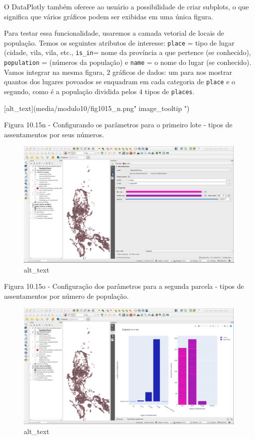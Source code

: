 \documentclass[
]{book}
\begin{document}
O DataPlotly também oferece ao usuário a possibilidade de criar subplots, o que significa que vários gráficos podem ser exibidas em uma única figura.

Para testar essa funcionalidade, usaremos a camada vetorial de locais de população. Temos os seguintes atributos de interesse: \texttt{place} = tipo de lugar (cidade, vila, vila, etc., \texttt{is\_in}= nome da província a que pertence (se conhecido), \texttt{population} = (números da população) e \texttt{name} = o nome do lugar (se conhecido). Vamos integrar na mesma figura, 2 gráficos de dados: um para nos mostrar quantos dos lugares povoados se enquadram em cada categoria de \texttt{place} e o segundo, como é a população dividida pelos 4 tipos de \texttt{places}.

{[}alt\_text{]}(media/modulo10/fig1015\_n.png" image\_tooltip ")

Figura 10.15n - Configurando os parâmetros para o primeiro lote - tipos de assentamentos por seus números.

\begin{figure}
\centering
\includegraphics{media/modulo10/fig1015_o.png}
\caption{alt\_text}
\end{figure}

Figura 10.15o - Configuração dos parâmetros para a segunda parcela - tipos de assentamentos por número de população.

\begin{figure}
\centering
\includegraphics{media/modulo10/fig1015_p.png}
\caption{alt\_text}
\end{figure}
\end{document}
